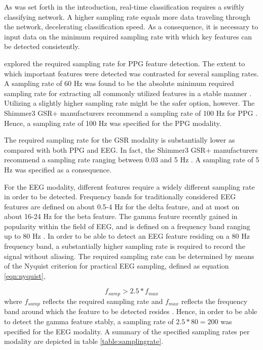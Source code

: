 \documentclass[12pt]{article}
\begin{document}
As was set forth in the introduction, real-time classification requires a swiftly classifying network. A higher sampling rate equals more data traveling through the network, decelerating classification speed. As a consequence, it is necessary to input data on the minimum required sampling rate with which key features can be detected consistently.

 explored the required sampling rate for PPG feature detection. The extent to which important features were detected was contrasted for several sampling rates. A sampling rate of 60 Hz was found to be the absolute minimum required sampling rate for extracting all commonly utilized features in a stable manner \cite{fujita2019evaluation}. Utilizing a slightly higher sampling rate might be the safer option, however. The Shimmer3 GSR+ manufacturers recommend a sampling rate of 100 Hz for PPG \cite{shimmer}. Hence, a sampling rate of 100 Hz was specified for the PPG modality. 

The required sampling rate for the GSR modality is substantially lower as compared with both PPG and EEG. In fact, the Shimmer3 GSR+ manufacturers recommend a sampling rate ranging between 0.03 and 5 Hz \cite{shimmer}. A sampling rate of 5 Hz was specified as a consequence. 

For the EEG modality, different features require a widely different sampling rate in order to be detected. Frequency bands for traditionally considered EEG features are defined on about 0.5-4 Hz for the delta feature, and at most on about 16-24 Hz for the beta feature. The gamma feature recently gained in popularity within the field of EEG, and is defined on a frequency band ranging up to 80 Hz \cite{weiergraeber2016sampling}. In order to be able to detect an EEG feature residing on a 80 Hz frequency band, a substantially higher sampling rate is required to record the signal without aliasing. The required sampling rate can be determined by means of the Nyquist criterion for practical EEG sampling, defined as equation \ref{eqn:nyquist},

\begin{equation}
\label{eqn:nyquist}
f_{samp} > 2.5 * f_{max}
\end{equation}
where $f_{samp}$ reflects the required sampling rate and $f_{max}$ reflects the frequency band around which the feature to be detected resides \cite{srinivasan1998estimating}. Hence, in order to be able to detect the gamma feature stably, a sampling rate of $2.5*80=200$ was specified for the EEG modality. A summary of the specified sampling rates per modality are depicted in table \ref{table:samplingrate}.
\end{document}
